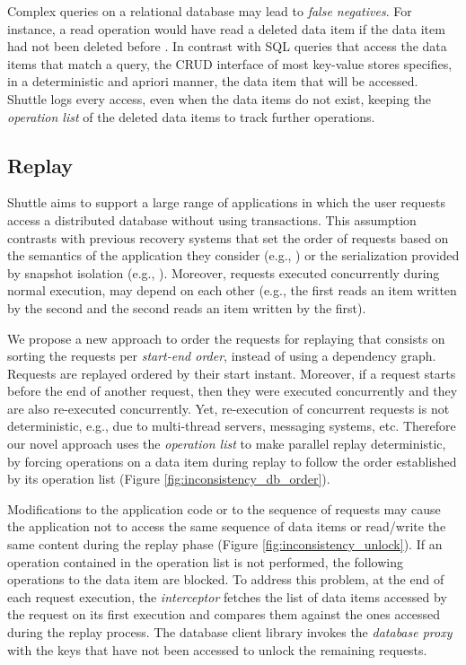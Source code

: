 Complex queries on a relational database may lead to \emph{false negatives}. For instance, a read operation would have read a deleted data item if the data item had not been deleted before \cite{Xie2008}. In contrast with SQL queries that access the data items that match a query, the \ac{CRUD} interface of most key-value stores specifies, in a deterministic and apriori manner, the data item that will be accessed. Shuttle logs every access, even when the data items do not exist, keeping the \emph{operation list} of the deleted data items to track further operations.


\subsection{Replay}
\label{sec:recovery:replay}

Shuttle aims to support a large range of applications in which the user requests access a distributed database without using transactions. This assumption contrasts with previous recovery systems that set the order of requests based on the semantics of the application they consider (e.g., \cite{undoForOperators}) or the serialization provided by snapshot isolation (e.g., \cite{Akkus2010}). Moreover, requests executed concurrently during  normal execution, may  depend on each other (e.g., the first reads an item written by the second and the second reads an item written by the first).

We propose a new approach to order the requests for replaying that consists on sorting the requests per \emph{start-end order}, instead of using a dependency graph. Requests are replayed ordered by their start instant. Moreover, if a request starts before the end of another request, then they were executed concurrently and they are also re-executed concurrently. 
Yet, re-execution of concurrent requests is not deterministic, e.g., due to multi-thread servers, messaging systems, etc. Therefore our novel approach uses the \emph{operation list} to make parallel replay deterministic, by forcing operations on a data item during replay to follow the order established by its operation list (Figure \ref{fig:inconsistency_db_order}).

Modifications to the application code or to the sequence of requests may cause the application not to access the same sequence of data items or read/write the same content during the replay phase (Figure \ref{fig:inconsistency_unlock}). If an operation contained in the operation list is not performed, the following operations to the data item are blocked. To address this problem, at the end of each request execution, the \textit{interceptor} fetches the list of data items accessed by the request on its first execution and compares them against the ones accessed during the replay process. The database client library invokes the \emph{database proxy} with the keys that have not been accessed to unlock the remaining requests. 


